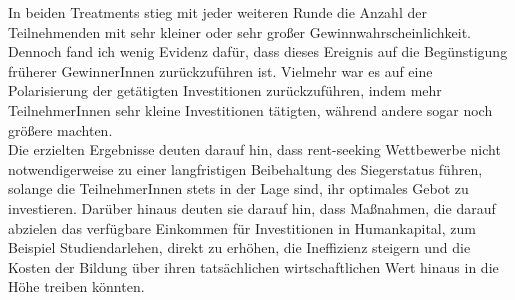 \begin{small}
In beiden Treatments stieg mit jeder weiteren Runde die Anzahl der Teilnehmenden mit sehr kleiner oder sehr großer Gewinnwahrscheinlichkeit. Dennoch fand ich wenig Evidenz dafür, dass dieses Ereignis auf die Begünstigung früherer GewinnerInnen zurückzuführen ist. Vielmehr war es auf eine Polarisierung der getätigten Investitionen zurückzuführen, indem mehr TeilnehmerInnen sehr kleine Investitionen tätigten, während andere sogar noch größere machten.\\

Die erzielten Ergebnisse deuten darauf hin, dass rent-seeking Wettbewerbe nicht notwendigerweise zu einer langfristigen Beibehaltung des  Siegerstatus führen, solange die TeilnehmerInnen stets in der Lage sind, ihr optimales Gebot zu investieren. Darüber hinaus deuten sie darauf hin, dass Maßnahmen, die darauf abzielen das verfügbare Einkommen für Investitionen in Humankapital, zum Beispiel Studiendarlehen, direkt zu erhöhen, die Ineffizienz steigern und die Kosten der Bildung über ihren tatsächlichen wirtschaftlichen Wert hinaus in die Höhe treiben könnten.
\end{small}